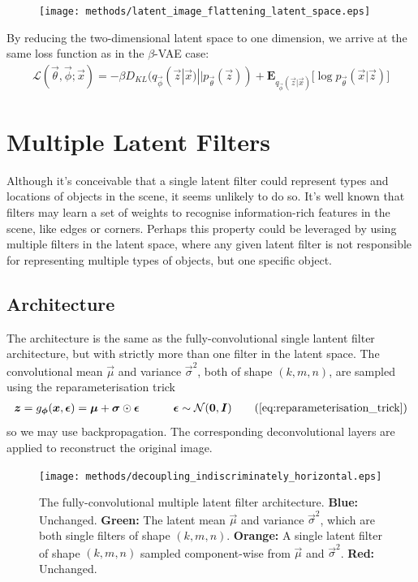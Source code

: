 \begin{figure}[h!]
\centering
\captionsetup{justification=centering}
\texttt{[image: methods/latent\_image\_flattening\_latent\_space.eps]}
\label{fig:latent_image_flattening_latent_space}
\end{figure}

By reducing the two-dimensional latent space to one dimension, we arrive at the same loss function as in the $\beta$-VAE case:
\begin{align}
\mathcal{L}(\vec{\theta}, \vec{\phi}; \vec{x}) = -\beta D_{KL}(q_{\vec{\phi}}(\vec{z}|\vec{x}) || p_{\vec{\theta}}(\vec{z})) + \mathbf{E}_{q_{\vec{\phi}}(\vec{z}|\vec{x})}\big[\log p_{\vec{\theta}}(\vec{x} | \vec{z}) \big]
\end{align}


%
%
%
%
%
\section{Multiple Latent Filters}

Although it's conceivable that a single latent filter could represent types and locations of objects in the scene, it seems unlikely to do so. It's well known that filters may learn a set of weights to recognise information-rich features in the scene, like edges or corners. Perhaps this property could be leveraged by using multiple filters in the latent space, where any given latent filter is not responsible for representing multiple types of objects, but one specific object.

%
%
\subsection{Architecture}
The architecture is the same as the fully-convolutional single lantent filter architecture, but with strictly more than one filter in the latent space. The convolutional mean $\vec{\mu}$ and variance $\vec{\sigma}^2$, both of shape $(k, m, n)$, are sampled using the reparameterisation trick
\begin{align}
\vec{z} = g_{\vec{\phi}}(\vec{x}, \vec{\epsilon}) = \vec{\mu} + \vec{\sigma} \odot \vec{\epsilon} \quad\quad\quad \vec{\epsilon} \sim \mathcal{N}(\vec{0}, \vec{I})
\tag{\ref{eq:reparameterisation_trick}}
\end{align}
so we may use backpropagation. The corresponding deconvolutional layers are applied to reconstruct the original image.\\

\begin{figure}[h!]
\centering
\captionsetup{justification=centering}
\texttt{[image: methods/decoupling\_indiscriminately\_horizontal.eps]}
\caption{The fully-convolutional multiple latent filter architecture. \textbf{Blue:} Unchanged. \textbf{Green:} The latent mean $\vec{\mu}$ and variance $\vec{\sigma}^2$, which are both single filters of shape $(k, m, n)$. \textbf{Orange:} A single latent filter of shape $(k, m, n)$ sampled component-wise from $\vec{\mu}$ and $\vec{\sigma}^2$. \textbf{Red:} Unchanged.}
\label{fig:decoupling_indiscriminately_horizontal}
\end{figure}

